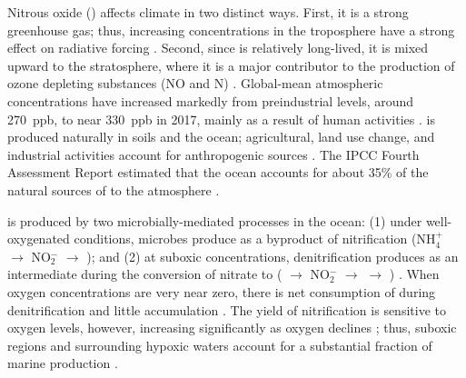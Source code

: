 \documentclass{report_chapter}
\begin{document}
Nitrous oxide (\NNO{}) affects climate in two distinct ways.
First, it is a strong greenhouse gas; thus, increasing \NNO{} concentrations in the troposphere have a strong effect on radiative forcing \citep{IPCC-2007}.
Second, since \NNO{} is relatively long-lived, it is mixed upward to the stratosphere, where it is a major contributor to the production of ozone depleting substances (NO and N\OO{}) \citep{WMO-2011,Wuebbles-2009}.
Global-mean atmospheric \NNO{} concentrations have increased markedly from preindustrial levels, around 270~ppb, to near 330~ppb in 2017, mainly as a result of human activities \citep[][NOAA ESRL Global Monitoring Division,
 Boulder, Colorado, USA]{Forster-Ramaswamy-etal-2007}.
\NNO{} is produced naturally in soils and the ocean; agricultural, land use change, and industrial activities account for anthropogenic sources \citep{Denman-Brasseur-etal-2007}.
The IPCC Fourth Assessment Report estimated that the ocean accounts for about 35\% of the natural sources of \NNO{} to the atmosphere \citep{Denman-Brasseur-etal-2007}.

\NNO{} is produced by two microbially-mediated processes in the ocean: (1) under well-oxygenated conditions, microbes produce \NNO{} as a byproduct of  nitrification
(NH$_4^+$ $\rightarrow$ NO$_2^-$ $\rightarrow$ \NOOO{});
and (2) at suboxic concentrations, denitrification produces \NNO{} as an intermediate during the conversion of nitrate to \NN{}
(\NOOO{} $\rightarrow$ NO$_2^-$ $\rightarrow$ \NNO{} $\rightarrow$ \NN{})
\citep{Bange-Freing-etal-2010}.
When oxygen concentrations are very near zero, there is net consumption of \NNO{} during denitrification and little \NNO{} accumulation \citep{Bange-Freing-etal-2010}.
The \NNO{} yield of nitrification is sensitive to oxygen levels, however, increasing significantly as oxygen declines \citep[e.g.,][]{Santoro-Buchwald-etal-2011,Loscher-Kock-etal-2012}; thus, suboxic regions and surrounding hypoxic waters account for a substantial fraction of marine \NNO{} production \citep{Codispoti-2010}.
\end{document}
